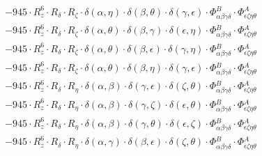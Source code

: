\documentclass{article}
\begin{document}
\begin{equation}
\begin{array}{c}
 \\[0.2em] 		 - 945 \cdot R_{z}^{6} \cdot R_{\delta{}} \cdot R_{\zeta{}} \cdot \delta{}\left(\alpha{}, \eta{}\right) \cdot \delta{}\left(\beta{}, \theta{}\right) \cdot \delta{}\left(\gamma{}, \epsilon{}\right) \cdot \Phi{}^{B}_{\alpha{}\beta{}\gamma{}\delta{}} \cdot \Phi{}^{A}_{\epsilon{}\zeta{}\eta{}\theta{}} 
 \\[0.2em] 		 - 945 \cdot R_{z}^{6} \cdot R_{\delta{}} \cdot R_{\zeta{}} \cdot \delta{}\left(\alpha{}, \theta{}\right) \cdot \delta{}\left(\beta{}, \gamma{}\right) \cdot \delta{}\left(\epsilon{}, \eta{}\right) \cdot \Phi{}^{B}_{\alpha{}\beta{}\gamma{}\delta{}} \cdot \Phi{}^{A}_{\epsilon{}\zeta{}\eta{}\theta{}} 
 \\[0.2em] 		 - 945 \cdot R_{z}^{6} \cdot R_{\delta{}} \cdot R_{\zeta{}} \cdot \delta{}\left(\alpha{}, \theta{}\right) \cdot \delta{}\left(\beta{}, \epsilon{}\right) \cdot \delta{}\left(\gamma{}, \eta{}\right) \cdot \Phi{}^{B}_{\alpha{}\beta{}\gamma{}\delta{}} \cdot \Phi{}^{A}_{\epsilon{}\zeta{}\eta{}\theta{}} 
 \\[0.2em] 		 - 945 \cdot R_{z}^{6} \cdot R_{\delta{}} \cdot R_{\zeta{}} \cdot \delta{}\left(\alpha{}, \theta{}\right) \cdot \delta{}\left(\beta{}, \eta{}\right) \cdot \delta{}\left(\gamma{}, \epsilon{}\right) \cdot \Phi{}^{B}_{\alpha{}\beta{}\gamma{}\delta{}} \cdot \Phi{}^{A}_{\epsilon{}\zeta{}\eta{}\theta{}} 
 \\[0.2em] 		 - 945 \cdot R_{z}^{6} \cdot R_{\delta{}} \cdot R_{\eta{}} \cdot \delta{}\left(\alpha{}, \beta{}\right) \cdot \delta{}\left(\gamma{}, \epsilon{}\right) \cdot \delta{}\left(\zeta{}, \theta{}\right) \cdot \Phi{}^{B}_{\alpha{}\beta{}\gamma{}\delta{}} \cdot \Phi{}^{A}_{\epsilon{}\zeta{}\eta{}\theta{}} 
 \\[0.2em] 		 - 945 \cdot R_{z}^{6} \cdot R_{\delta{}} \cdot R_{\eta{}} \cdot \delta{}\left(\alpha{}, \beta{}\right) \cdot \delta{}\left(\gamma{}, \zeta{}\right) \cdot \delta{}\left(\epsilon{}, \theta{}\right) \cdot \Phi{}^{B}_{\alpha{}\beta{}\gamma{}\delta{}} \cdot \Phi{}^{A}_{\epsilon{}\zeta{}\eta{}\theta{}} 
 \\[0.2em] 		 - 945 \cdot R_{z}^{6} \cdot R_{\delta{}} \cdot R_{\eta{}} \cdot \delta{}\left(\alpha{}, \beta{}\right) \cdot \delta{}\left(\gamma{}, \theta{}\right) \cdot \delta{}\left(\epsilon{}, \zeta{}\right) \cdot \Phi{}^{B}_{\alpha{}\beta{}\gamma{}\delta{}} \cdot \Phi{}^{A}_{\epsilon{}\zeta{}\eta{}\theta{}} 
 \\[0.2em] 		 - 945 \cdot R_{z}^{6} \cdot R_{\delta{}} \cdot R_{\eta{}} \cdot \delta{}\left(\alpha{}, \gamma{}\right) \cdot \delta{}\left(\beta{}, \epsilon{}\right) \cdot \delta{}\left(\zeta{}, \theta{}\right) \cdot \Phi{}^{B}_{\alpha{}\beta{}\gamma{}\delta{}} \cdot \Phi{}^{A}_{\epsilon{}\zeta{}\eta{}\theta{}} 

\end{array}
\end{equation}
\end{document}
